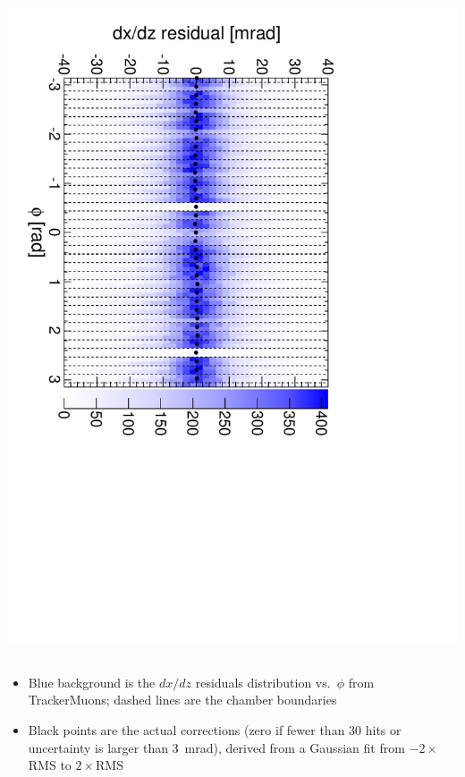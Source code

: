 \documentclass[compress]{beamer}
\begin{document}
\begin{frame}
\begin{columns}
\includegraphics[height=\linewidth, angle=90]{iter02_mem11.pdf}
\end{columns}

\begin{itemize}
\item Blue background is the $dx/dz$ residuals distribution
  vs.\ $\phi$ from TrackerMuons; dashed lines are the chamber boundaries
\item Black points are the actual corrections (zero if fewer than 30
  hits or uncertainty is larger than 3~mrad), derived from a Gaussian
  fit from $-2\times$RMS to $2\times$RMS
\end{itemize}
\end{frame}
\end{document}
